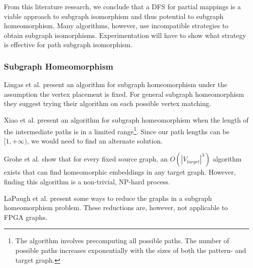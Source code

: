 From this literature research, we conclude that a DFS for partial mappings is a viable approach to subgraph isomorphism and thus potential to subgraph homeomorphism. Many algorithms, however, use incompatible strategies to obtain subgraph isomorphisms. Experimentation will have to show what strategy is effective for path subgraph isomorphism.


\subsubsection{Subgraph Homeomorphism}
Lingas et al.\cite{LINGAS2009464} present an algorithm for subgraph homeomorphism under the assumption the vertex placement is fixed. For general subgraph homeomorphism they suggest trying their algorithm on each possible vertex matching.

Xiao et al.\cite{XIAONODEDISJOINT} present an algorithm for subgraph homeomorphism when the length of the intermediate paths is in a limited range\footnote{The algorithm involves precomputing all possible paths. The number of possible paths increases exponentially with the sizes of both the pattern- and target graph.}. Since our path lengths can be $[1, +\infty)$, we would need to find an alternate solution.

Grohe et al.\cite{Grohe2011479} show that for every fixed source graph, an $O(|V_{target}|^3)$ algorithm exists that can find homeomorphic embeddings in any target graph. However, finding this algorithm is a non-trivial, NP-hard process.

LaPaugh et al.\cite{LaPaughOptim} present some ways to reduce the graphs in a subgraph homeomorphism problem. These reductions are, however, not applicable to FPGA graphs.


